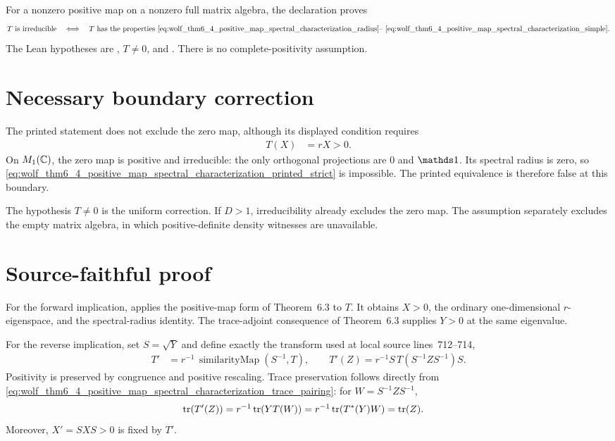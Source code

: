 \documentclass[11pt]{article}
\begin{document}
For a nonzero positive map on a nonzero full matrix algebra, the declaration
 proves
\begin{align}
  T\text{ is irreducible}
    \quad\Longleftrightarrow\quad
  T\text{ has the properties
    \eqref{eq:wolf_thm6_4_positive_map_spectral_characterization_radius}--
    \eqref{eq:wolf_thm6_4_positive_map_spectral_characterization_simple}}.
  \label{eq:wolf_thm6_4_positive_map_spectral_characterization_iff}
\end{align}
The Lean hypotheses are , $T\neq0$, and
.  There is no complete-positivity assumption.

\section{Necessary boundary correction}

The printed statement does not exclude the zero map, although its displayed
condition requires
\begin{align}
  T(X)
    &=rX>0.
  \label{eq:wolf_thm6_4_positive_map_spectral_characterization_printed_strict}
\end{align}
On $M_{1}(\mathbb{C})$, the zero map is positive and irreducible: the only orthogonal
projections are $0$ and $\Id$.  Its spectral radius is zero, so
\eqref{eq:wolf_thm6_4_positive_map_spectral_characterization_printed_strict}
is impossible.  The printed equivalence is therefore false at this boundary.

The hypothesis $T\neq0$ is the uniform correction.  If $D>1$, irreducibility
already excludes the zero map.  The assumption  separately
excludes the empty matrix algebra, in which positive-definite density witnesses
are unavailable.

\section{Source-faithful proof}

For the forward implication,
 applies the
positive-map form of Theorem~6.3 to $T$.  It obtains $X>0$, the ordinary
one-dimensional $r$-eigenspace, and the spectral-radius identity.  The
trace-adjoint consequence of Theorem~6.3 supplies $Y>0$ at the same eigenvalue.

For the reverse implication, set $S=\sqrt{Y}$ and define exactly the transform
used at local source lines~712--714,
\begin{align}
  T'
    &=r^{-1}\,\operatorname{similarityMap}(S^{-1},T),
  \qquad
  T'(Z)=r^{-1}S\,T(S^{-1}ZS^{-1})S.
  \label{eq:wolf_thm6_4_positive_map_spectral_characterization_gauge}
\end{align}
Positivity is preserved by congruence and positive rescaling.  Trace
preservation follows directly from
\eqref{eq:wolf_thm6_4_positive_map_spectral_characterization_trace_pairing}:
for $W=S^{-1}ZS^{-1}$,
\begin{align}
  \operatorname{tr}(T'(Z))
    &=r^{-1}\operatorname{tr}(YT(W))
      =r^{-1}\operatorname{tr}(T^*(Y)W)
      =\operatorname{tr}(Z).
  \label{eq:wolf_thm6_4_positive_map_spectral_characterization_tp}
\end{align}
Moreover, $X'=SXS>0$ is fixed by $T'$.
\end{document}
